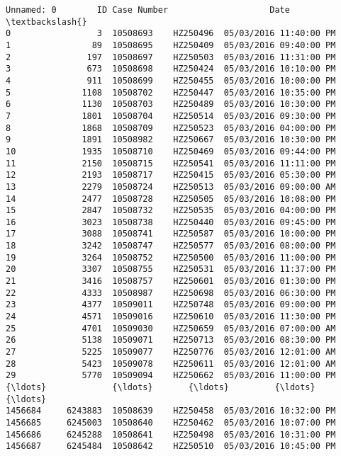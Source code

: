 \documentclass[11pt]{article}
\begin{document}
    \begin{Verbatim}[commandchars=\\\{\}]
         Unnamed: 0        ID Case Number                    Date  \textbackslash{}
0                 3  10508693    HZ250496  05/03/2016 11:40:00 PM   
1                89  10508695    HZ250409  05/03/2016 09:40:00 PM   
2               197  10508697    HZ250503  05/03/2016 11:31:00 PM   
3               673  10508698    HZ250424  05/03/2016 10:10:00 PM   
4               911  10508699    HZ250455  05/03/2016 10:00:00 PM   
5              1108  10508702    HZ250447  05/03/2016 10:35:00 PM   
6              1130  10508703    HZ250489  05/03/2016 10:30:00 PM   
7              1801  10508704    HZ250514  05/03/2016 09:30:00 PM   
8              1868  10508709    HZ250523  05/03/2016 04:00:00 PM   
9              1891  10508982    HZ250667  05/03/2016 10:30:00 PM   
10             1935  10508710    HZ250469  05/03/2016 09:44:00 PM   
11             2150  10508715    HZ250541  05/03/2016 11:11:00 PM   
12             2193  10508717    HZ250415  05/03/2016 05:30:00 PM   
13             2279  10508724    HZ250513  05/03/2016 09:00:00 AM   
14             2477  10508728    HZ250505  05/03/2016 10:08:00 PM   
15             2847  10508732    HZ250535  05/03/2016 04:00:00 PM   
16             3023  10508738    HZ250440  05/03/2016 09:45:00 PM   
17             3088  10508741    HZ250587  05/03/2016 10:00:00 PM   
18             3242  10508747    HZ250577  05/03/2016 08:00:00 PM   
19             3264  10508752    HZ250500  05/03/2016 11:00:00 PM   
20             3307  10508755    HZ250531  05/03/2016 11:37:00 PM   
21             3416  10508757    HZ250601  05/03/2016 01:30:00 PM   
22             4333  10508987    HZ250698  05/03/2016 06:30:00 PM   
23             4377  10509011    HZ250748  05/03/2016 09:00:00 PM   
24             4571  10509016    HZ250610  05/03/2016 11:30:00 PM   
25             4701  10509030    HZ250659  05/03/2016 07:00:00 AM   
26             5138  10509071    HZ250713  05/03/2016 08:30:00 PM   
27             5225  10509077    HZ250776  05/03/2016 12:01:00 AM   
28             5423  10509078    HZ250611  05/03/2016 12:01:00 AM   
29             5770  10509094    HZ250662  05/03/2016 11:00:00 PM   
{\ldots}             {\ldots}       {\ldots}         {\ldots}                     {\ldots}   
1456684     6243883  10508639    HZ250458  05/03/2016 10:32:00 PM   
1456685     6245003  10508640    HZ250462  05/03/2016 10:07:00 PM   
1456686     6245288  10508641    HZ250498  05/03/2016 10:31:00 PM   
1456687     6245484  10508642    HZ250510  05/03/2016 10:45:00 PM   

\end{Verbatim}
\end{document}
